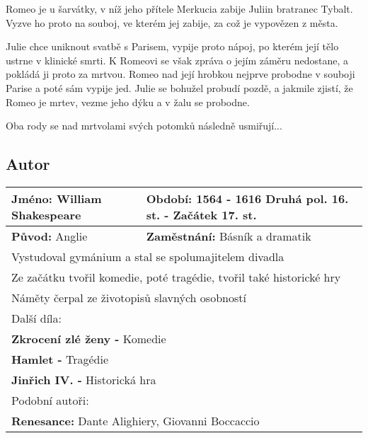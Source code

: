 Romeo je u šarvátky, v níž jeho přítele Merkucia zabije Juliin bratranec Tybalt.
Vyzve ho proto na souboj, ve kterém jej zabije, za což je vypovězen z města.

Julie chce uniknout svatbě s Parisem, vypije proto nápoj, po kterém její tělo ustrne v klinické smrti.
K Romeovi se však zpráva o jejím záměru nedostane, a pokládá ji proto za mrtvou.
Romeo nad její hrobkou nejprve probodne v souboji Parise a poté sám vypije jed.
Julie se bohužel probudí pozdě, a jakmile zjistí, že Romeo je mrtev, vezme jeho dýku a v žalu se probodne.

Oba rody se nad mrtvolami svých potomků následně usmiřují...

\subsection*{Autor}
\begin{tabularx}{\linewidth}{l|l}
    \textbf{Jméno:} William Shakespeare & \textbf{Období:} 1564 - 1616 Druhá pol. 16. st. - Začátek 17. st. \\
    \hline
    \textbf{Původ:} Anglie              & \textbf{Zaměstnání:} Básník a dramatik                            \\
    \hline
    \multicolumn{2}{l}{Vystudoval gymánium a stal se spolumajitelem divadla}                                \\
    \multicolumn{2}{l}{Ze začátku tvořil komedie, poté tragédie, tvořil také historické hry}                \\
    \multicolumn{2}{l}{Náměty čerpal ze životopisů slavných osobností}                                      \\
    \hline
    \multicolumn{2}{l}{Další díla:}                                                                         \\
    \multicolumn{2}{l}{\textbf{Zkrocení zlé ženy -} Komedie}                                                \\
    \multicolumn{2}{l}{\textbf{Hamlet -} Tragédie}                                                          \\
    \multicolumn{2}{l}{\textbf{Jinřich IV. -} Historická hra}                                               \\
    \hline
    \multicolumn{2}{l}{Podobní autoři:}                                                                     \\
    \multicolumn{2}{l}{\textbf{Renesance:} Dante Alighiery, Giovanni Boccaccio}                             \\
\end{tabularx}
